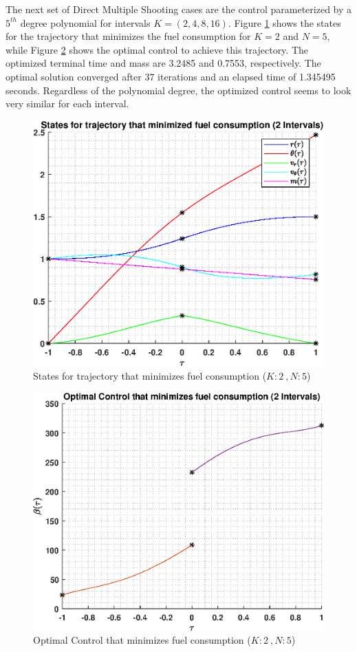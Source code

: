 \documentclass[]{article}
\begin{document}
\FloatBarrier
\noindent
The next set of Direct Multiple Shooting cases are the control parameterized by a \(5^{th}\) degree polynomial for intervals \(K = (2,4,8,16)\). Figure \ref{fig:directStatesK2Poly5} shows the states for the trajectory that minimizes the fuel consumption for \(K = 2\) and  \(N = 5\), while Figure \ref{fig:directControlK2Poly5} shows the optimal control to achieve this trajectory. The optimized terminal time and mass are 3.2485 and 0.7553, respectively. The optimal solution converged after 37 iterations and an elapsed time of 1.345495 seconds. Regardless of the polynomial degree, the optimized control seems to look very similar for each interval.
\begin{figure}
	\centering
	\includegraphics[scale=0.75]{directStatesK2Poly5.eps}
	\caption{States for trajectory that minimizes fuel consumption (\(K:2\ , N:5\))}
	\label{fig:directStatesK2Poly5}
\end{figure}
\begin{figure}
	\centering
	\includegraphics[scale=0.75]{directControlK2Poly5.eps}
	\caption{Optimal Control that minimizes fuel consumption (\(K:2\ , N:5\))}
	\label{fig:directControlK2Poly5}
\end{figure}
\end{document}
